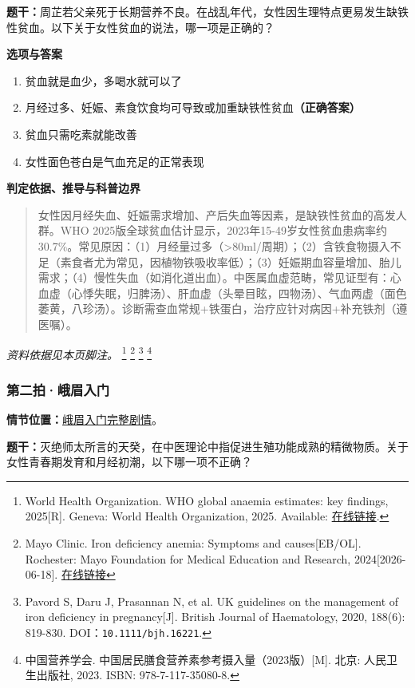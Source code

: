 \textbf{题干：}周芷若父亲死于长期营养不良。在战乱年代，女性因生理特点更易发生缺铁性贫血。以下关于女性贫血的说法，哪一项是正确的？

\textbf{选项与答案}
\begin{enumerate}[label=\Alph*.,leftmargin=*]
  \item 贫血就是血少，多喝水就可以了
  \item 月经过多、妊娠、素食饮食均可导致或加重缺铁性贫血\textbf{（正确答案）}
  \item 贫血只需吃素就能改善
  \item 女性面色苍白是气血充足的正常表现
\end{enumerate}
\textbf{判定依据、推导与科普边界}
\begin{quote}女性因月经失血、妊娠需求增加、产后失血等因素，是缺铁性贫血的高发人群。WHO 2025版全球贫血估计显示，2023年15-49岁女性贫血患病率约30.7\%。常见原因：（1）月经量过多（>80ml/周期）；（2）含铁食物摄入不足（素食者尤为常见，因植物铁吸收率低）；（3）妊娠期血容量增加、胎儿需求；（4）慢性失血（如消化道出血）。中医属血虚范畴，常见证型有：心血虚（心悸失眠，归脾汤）、肝血虚（头晕目眩，四物汤）、气血两虚（面色萎黄，八珍汤）。诊断需查血常规+铁蛋白，治疗应针对病因+补充铁剂（遵医嘱）。\end{quote}
\noindent\textit{资料依据见本页脚注。}
\footnote{World Health Organization. WHO global anaemia estimates: key findings, 2025[R]. Geneva: World Health Organization, 2025. Available: \href{https://www.who.int/publications/i/item/9789240113930}{在线链接}.}
\footnote{Mayo Clinic. Iron deficiency anemia: Symptoms and causes[EB/OL]. Rochester: Mayo Foundation for Medical Education and Research, 2024[2026-06-18]. \href{https://www.mayoclinic.org/diseases-conditions/iron-deficiency-anemia/symptoms-causes/syc-20355034}{在线链接}}
\footnote{Pavord S, Daru J, Prasannan N, et al. UK guidelines on the management of iron deficiency in pregnancy[J]. British Journal of Haematology, 2020, 188(6): 819-830. DOI：\nolinkurl{10.1111/bjh.16221}.}
\footnote{中国营养学会. 中国居民膳食营养素参考摄入量（2023版）[M]. 北京: 人民卫生出版社, 2023. ISBN: 978-7-117-35080-8.}

\subsubsection{第二拍·峨眉入门}\label{question:zhouzhiruo:2}
\textbf{情节位置：}\hyperref[plot:zhouzhiruo:2]{峨眉入门完整剧情}。

\textbf{题干：}灭绝师太所言的天癸，在中医理论中指促进生殖功能成熟的精微物质。关于女性青春期发育和月经初潮，以下哪一项不正确？

